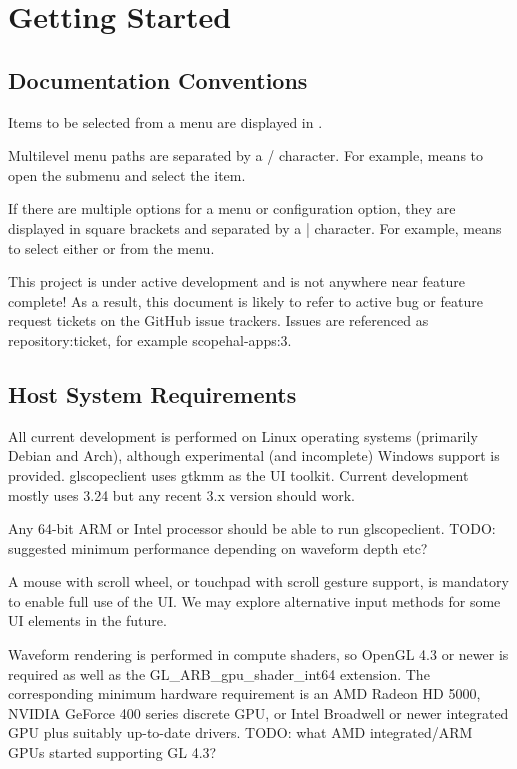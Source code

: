 \chapter{Getting Started}

\section{Documentation Conventions}

Items to be selected from a menu are displayed in .

Multilevel menu paths are separated by a / character. For example,  means to open the
 submenu and select the  item.

If there are multiple options for a menu or configuration option, they are displayed in square brackets and separated
by a | character. For example,  means to select either
 or  from the 
menu.

This project is under active development and is not anywhere near feature complete! As a result, this document is
likely to refer to active bug or feature request tickets on the GitHub issue trackers. Issues are referenced as
repository:ticket, for example scopehal-apps:3.

\section{Host System Requirements}

All current development is performed on Linux operating systems (primarily Debian and Arch), although experimental (and
incomplete) Windows support is provided. glscopeclient uses gtkmm as the UI toolkit. Current development mostly uses
3.24 but any recent 3.x version should work.

Any 64-bit ARM or Intel processor should be able to run glscopeclient. TODO: suggested minimum performance depending on
waveform depth etc?

A mouse with scroll wheel, or touchpad with scroll gesture support, is mandatory to enable full use of the UI. We may
explore alternative input methods for some UI elements in the future.

Waveform rendering is performed in compute shaders, so OpenGL 4.3 or newer is required as well as the
GL\_ARB\_gpu\_shader\_int64 extension. The corresponding minimum hardware requirement is an AMD Radeon HD 5000, NVIDIA
GeForce 400 series discrete GPU, or Intel Broadwell or newer integrated GPU plus suitably up-to-date drivers.
TODO: what AMD integrated/ARM GPUs started supporting GL 4.3?

